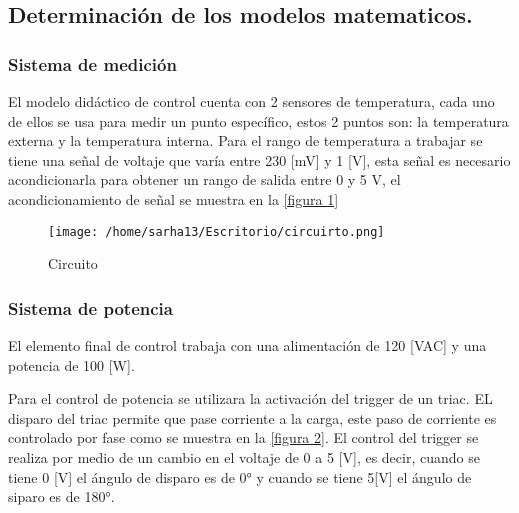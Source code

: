 \documentclass[letter,operight,12pt,spanish]{report}
\begin{document}
\subsection{Determinaci\'on de los modelos matematicos.}

\subsubsection{Sistema de medici\'on}

El modelo did\'actico de control cuenta con 2 sensores de temperatura, cada uno de ellos se usa para medir un punto espec\'ifico, estos 2 puntos son: la temperatura externa y la temperatura interna. Para el rango de temperatura a trabajar se tiene una se\~nal de voltaje que var\'ia entre 230 [mV] y 1
[V], esta se\~nal es necesario acondicionarla para obtener un rango de salida entre 0 y 5 V, el acondicionamiento de se\~nal se muestra en la \ref{figura 1}

\begin{figure}[htp]
\centering
\texttt{[image: /home/sarha13/Escritorio/circuirto.png]}
\caption{Circuito}
\label{}
\end{figure}


\subsubsection{Sistema de potencia}

El elemento final de control trabaja con una alimentaci\'on de 120 [VAC] y una potencia de 100 [W]. 

Para el control de potencia se utilizara la activaci\'on del trigger de un triac. EL disparo del triac permite que pase corriente a la carga, este paso de corriente es controlado por fase como se muestra en la \ref{figura 2}. El control del trigger se realiza por medio de un cambio en el voltaje de 0 a 5 [V], es decir, cuando se tiene 0 [V] el \'angulo de disparo es de 0° y cuando se tiene 5[V] el \'angulo de siparo es de 180°.\\\\\\\\\\\\\\\\\\\\\\\\
 
\end{document}
